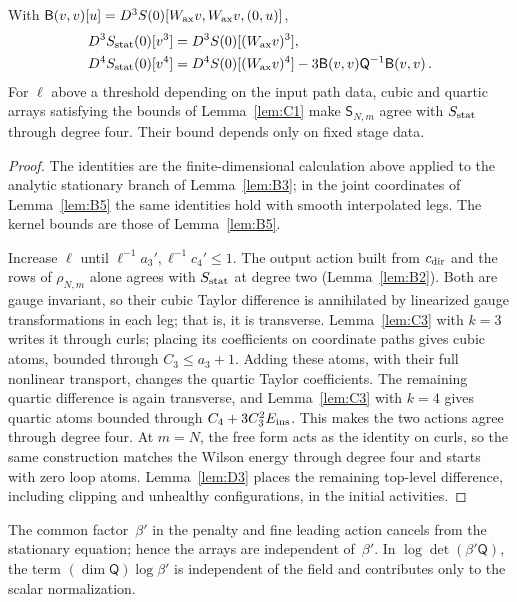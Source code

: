 \begin{lemma}\label{lem:C4}
With $\mathsf B(v,v)[u]=D^3S(0)[W_{\rm ax}v,W_{\rm ax}v,(0,u)]$,
\begin{align*}
D^3S_{\rm stat}(0)[v^3]&=D^3S(0)[(W_{\rm ax}v)^3],\\
D^4S_{\rm stat}(0)[v^4]&=D^4S(0)[(W_{\rm ax}v)^4]-3\mathsf B(v,v)\mathsf Q^{-1}\mathsf B(v,v)\,.
\end{align*}
For $\ell$ above a threshold depending on the input path data, cubic and quartic arrays satisfying the bounds of Lemma~\ref{lem:C1} make $\mathsf S_{N,m}$ agree with $S_{\rm stat}$ through degree four. Their bound depends only on fixed stage data.
\end{lemma}

\begin{proof}
The identities are the finite-dimensional calculation above applied to the analytic stationary branch of Lemma~\ref{lem:B3}; in the joint coordinates of Lemma~\ref{lem:B5} the same identities hold with smooth interpolated legs. The kernel bounds are those of Lemma~\ref{lem:B5}.

Increase $\ell$ until $\ell^{-1}a_3',\ell^{-1}c_4'\le1$. The output action built from $c_{\rm dir}$ and the rows of $\rho_{N,m}$ alone agrees with $S_{\rm stat}$ at degree two (Lemma~\ref{lem:B2}). Both are gauge invariant, so their cubic Taylor difference is annihilated by linearized gauge transformations in each leg; that is, it is transverse. Lemma~\ref{lem:C3} with $k=3$ writes it through curls; placing its coefficients on coordinate paths gives cubic atoms, bounded through $C_3\le a_3+1$. Adding these atoms, with their full nonlinear transport, changes the quartic Taylor coefficients. The remaining quartic difference is again transverse, and Lemma~\ref{lem:C3} with $k=4$ gives quartic atoms bounded through $C_4+3C_3^2E_{\rm ins}$. This makes the two actions agree through degree four. At $m=N$, the free form acts as the identity on curls, so the same construction matches the Wilson energy through degree four and starts with zero loop atoms. Lemma~\ref{lem:D3} places the remaining top-level difference, including clipping and unhealthy configurations, in the initial activities.
\end{proof}

The common factor~$\beta'$ in the penalty and fine leading action cancels from the stationary equation; hence the arrays are independent of~$\beta'$. In $\log\det(\beta'\mathsf Q)$, the term $(\dim\mathsf Q)\log\beta'$ is independent of the field and contributes only to the scalar normalization.

